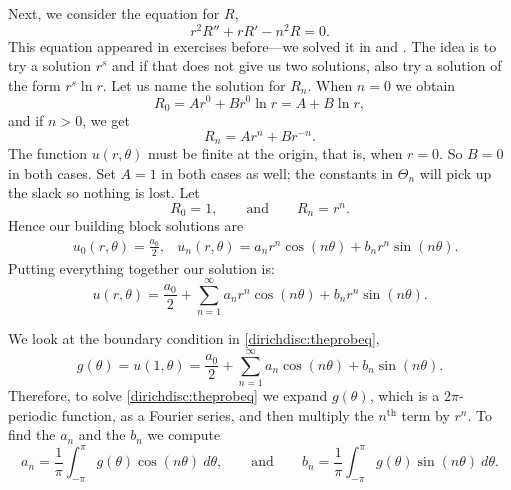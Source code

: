 Next, we consider the equation for $R$,
\begin{equation*}
r^2 R'' + r R' - n^2 R = 0.
\end{equation*}
This equation appeared in exercises before---we
solved it in 
and .  The idea is to try a solution
$r^s$ and if that does not give us two solutions, also try a solution of the form
$r^s \ln r$.  Let us name the solution for $R_n$.  When $n=0$ we obtain
\begin{equation*}
R_0 = A r^0 + B r^0 \ln r = A + B \ln r ,
\end{equation*}
and if $n > 0$, we get
\begin{equation*}
R_n = A r^n + B r^{-n} .
\end{equation*}
The function $u(r,\theta)$ must be finite at the origin, that is, when $r=0$.
So $B=0$ in both
cases.  Set $A=1$ in both cases as well; the constants in $\Theta_n$
will pick up the slack so nothing is lost.  Let
\begin{equation*}
R_0 = 1 , \qquad \text{and} \qquad
R_n = r^n .
\end{equation*}
Hence our building block solutions are
\begin{align*}
& u_0(r,\theta) = \frac{a_0}{2} ,
& u_n(r,\theta) = a_n r^n \cos(n \theta) + b_n r^n \sin(n \theta) .
\end{align*}
Putting everything together our solution is:
\begin{equation*}
\boxed{~~
u(r,\theta)
=
\frac{a_0}{2} +
\sum_{n=1}^\infty
a_n r^n \cos(n \theta) + b_n r^n \sin(n \theta) .
~~}
\end{equation*}

We look at the boundary condition in \eqref{dirichdisc:theprobeq},
\begin{equation*}
g(\theta) = u(1,\theta)
=
\frac{a_0}{2} +
\sum_{n=1}^\infty
a_n \cos(n \theta) + b_n \sin(n \theta) .
\end{equation*}
Therefore, to solve \eqref{dirichdisc:theprobeq}
we expand $g(\theta)$, which is 
a $2\pi$-periodic function, as a Fourier series, and then 
multiply the $n^{\text{th}}$ term by $r^n$.  To
find the $a_n$ and the $b_n$ we compute
\begin{equation*}
a_n =
\frac{1}{\pi} \int_{-\pi}^\pi g(\theta) \cos (n\theta) ~ d\theta , \qquad
\text{and} \qquad
b_n =
\frac{1}{\pi} \int_{-\pi}^\pi g(\theta) \sin (n\theta) ~ d\theta.
\end{equation*}

